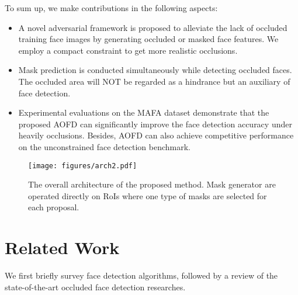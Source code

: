 \documentclass[10pt,twocolumn,letterpaper]{article}
\begin{document}
To sum up, we make contributions in the following aspects:
\begin{itemize}
  \item A novel adversarial framework is proposed to alleviate the lack of occluded training face images by generating occluded or masked face features. We employ a compact constraint to get more realistic occlusions.
  \item Mask prediction is conducted simultaneously while detecting occluded faces. The occluded area will NOT be regarded as a hindrance but an auxiliary of face detection.
\item 
  Experimental evaluations on the MAFA dataset demonstrate that the proposed AOFD can significantly improve the face detection accuracy under heavily occlusions. Besides, AOFD can also achieve competitive performance on the unconstrained face detection benchmark.
\end{itemize}


\begin{figure*}[t]
	\begin{center}
		\texttt{[image: figures/arch2.pdf]}
	\end{center}
	\vspace{-6pt}
	\caption{The overall architecture of the proposed method. Mask generator are operated directly on RoIs where one type of masks are selected for each proposal.}
	\vspace{-10pt}
	\label{fig:model}
\end{figure*}



\section{Related Work}





We first briefly survey face detection algorithms, followed by a review of the state-of-the-art occluded face detection researches.
\end{document}
